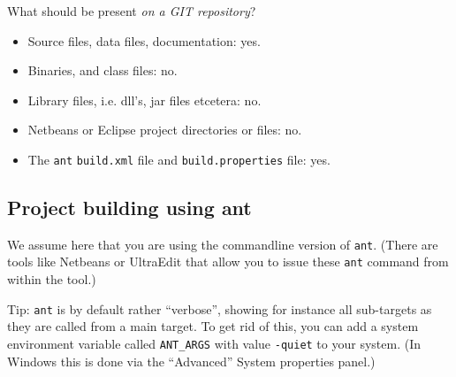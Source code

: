 What should be present \emph{on a GIT repository}?
\begin{itemize}
\item Source files, data files, documentation: yes.
\item Binaries, and class files: no.
\item Library files, i.e. dll's, jar files etcetera: no.
\item Netbeans or Eclipse project directories or files: no.
\item The \verb"ant" \verb"build.xml" file and  \verb"build.properties" file: yes.
\end{itemize}

\subsection{Project building using ant }

We assume here that you are using the commandline version of \verb"ant". (There are tools
like Netbeans or UltraEdit that allow you to issue these \verb"ant" command from within the tool.)

Tip: \verb"ant" is by default rather ``verbose'', showing for instance all sub-targets as they are called
from a main target. To get rid of this, you can add a system environment variable
called \verb"ANT_ARGS" with value \verb"-quiet" to your system. (In Windows this is done via
the ``Advanced'' System properties panel.)

